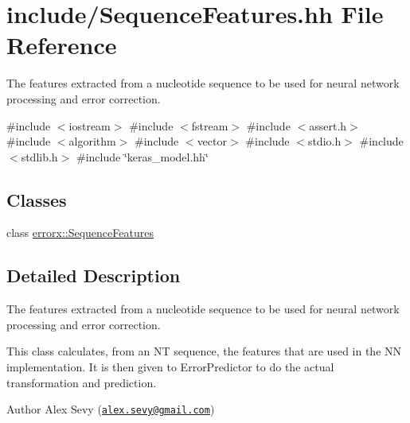 \hypertarget{_sequence_features_8hh}{}\section{include/\+Sequence\+Features.hh File Reference}
\label{_sequence_features_8hh}


The features extracted from a nucleotide sequence to be used for neural network processing and error correction.  


{\ttfamily \#include $<$iostream$>$}\newline
{\ttfamily \#include $<$fstream$>$}\newline
{\ttfamily \#include $<$assert.\+h$>$}\newline
{\ttfamily \#include $<$algorithm$>$}\newline
{\ttfamily \#include $<$vector$>$}\newline
{\ttfamily \#include $<$stdio.\+h$>$}\newline
{\ttfamily \#include $<$stdlib.\+h$>$}\newline
{\ttfamily \#include \char`\"{}keras\+\_\+model.\+hh\char`\"{}}\newline
\subsection*{Classes}
\begin{DoxyCompactItemize}
\item 
class \mbox{\hyperlink{classerrorx_1_1_sequence_features}{errorx\+::\+Sequence\+Features}}
\end{DoxyCompactItemize}


\subsection{Detailed Description}
The features extracted from a nucleotide sequence to be used for neural network processing and error correction. 

This class calculates, from an NT sequence, the features that are used in the NN implementation. It is then given to Error\+Predictor to do the actual transformation and prediction. \begin{DoxyAuthor}{Author}
Alex Sevy (\href{mailto:alex.sevy@gmail.com}{\tt alex.\+sevy@gmail.\+com}) 
\end{DoxyAuthor}
